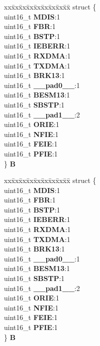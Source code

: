 \begin{DoxyCompactItemize}
\begin{tabbing}
\end{tabbing}\item 
\mbox{\label{unionESCI__tag_1_1ESCI__CR2__tag_a572d10a3984b9502090d84654c8c0847}} 
\begin{tabbing}
xx\=xx\=xx\=xx\=xx\=xx\=xx\=xx\=xx\=\kill
struct \{\\
\>uint16\_t {\bfseries MDIS}:1\\
\>uint16\_t {\bfseries FBR}:1\\
\>uint16\_t {\bfseries BSTP}:1\\
\>uint16\_t {\bfseries IEBERR}:1\\
\>uint16\_t {\bfseries RXDMA}:1\\
\>uint16\_t {\bfseries TXDMA}:1\\
\>uint16\_t {\bfseries BRK13}:1\\
\>uint16\_t {\bfseries \_\_pad0\_\_}:1\\
\>uint16\_t {\bfseries BESM13}:1\\
\>uint16\_t {\bfseries SBSTP}:1\\
\>uint16\_t {\bfseries \_\_pad1\_\_}:2\\
\>uint16\_t {\bfseries ORIE}:1\\
\>uint16\_t {\bfseries NFIE}:1\\
\>uint16\_t {\bfseries FEIE}:1\\
\>uint16\_t {\bfseries PFIE}:1\\
\} {\bfseries B}\\

\end{tabbing}\item 
\mbox{\label{unionESCI__tag_1_1ESCI__CR2__tag_a81e71d088c94c8f089c98cd5f524b13e}} 
\begin{tabbing}
xx\=xx\=xx\=xx\=xx\=xx\=xx\=xx\=xx\=\kill
struct \{\\
\>uint16\_t {\bfseries MDIS}:1\\
\>uint16\_t {\bfseries FBR}:1\\
\>uint16\_t {\bfseries BSTP}:1\\
\>uint16\_t {\bfseries IEBERR}:1\\
\>uint16\_t {\bfseries RXDMA}:1\\
\>uint16\_t {\bfseries TXDMA}:1\\
\>uint16\_t {\bfseries BRK13}:1\\
\>uint16\_t {\bfseries \_\_pad0\_\_}:1\\
\>uint16\_t {\bfseries BESM13}:1\\
\>uint16\_t {\bfseries SBSTP}:1\\
\>uint16\_t {\bfseries \_\_pad1\_\_}:2\\
\>uint16\_t {\bfseries ORIE}:1\\
\>uint16\_t {\bfseries NFIE}:1\\
\>uint16\_t {\bfseries FEIE}:1\\
\>uint16\_t {\bfseries PFIE}:1\\
\} {\bfseries B}\\


\end{tabbing}
\end{DoxyCompactItemize}
